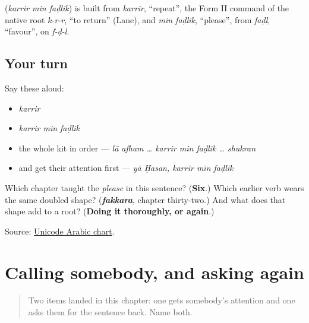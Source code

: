 \begin{cousinweb}
\textbf{  } (\emph{karrir min faḍlik}) is built from \emph{karrir}, \textquotedblleft{}repeat\textquotedblright{}, the Form II command of the native root \emph{k-r-r}, \textquotedblleft{}to return\textquotedblright{} (Lane), and \emph{min faḍlik}, \textquotedblleft{}please\textquotedblright{}, from \emph{faḍl}, \textquotedblleft{}favour\textquotedblright{}, on \emph{f-ḍ-l}.
\end{cousinweb}

\subsection*{Your turn}
Say these aloud:

\begin{itemize}
\raggedright
  \item \emph{karrir}
  \item \emph{karrir min faḍlik}
  \item the whole kit in order — \emph{lā afham … karrir min faḍlik … shukran}
  \item and get their attention first — \emph{yā Ḥasan, karrir min faḍlik}
\end{itemize}

\begin{tcolorbox}[breakable,colback=teal!4,colframe=teal!35!black,title={Before you move on}]
Which chapter taught the \emph{please} in this sentence? (\textbf{Six}.) Which earlier verb wears the same doubled shape? (\emph{\textbf{fakkara}}, chapter thirty-two.) And what does that shape add to a root? (\textbf{Doing it thoroughly, or again}.)

Source: \href{https://www.unicode.org/charts/PDF/U0600.pdf}{Unicode Arabic chart}.
\end{tcolorbox}
\section[\texorpdfstring{\ar{يا} · \ar{كرّر} \ar{من} \ar{فضلك} (yā · karrir min …)}{يا · كرّر من فضلك (yā · karrir min …)}]{Calling somebody, and asking again}

\label{lesson:AR-R41-calling-and-asking-again}



\begin{quote}
Two items landed in this chapter: one gets somebody's attention and one asks them for the sentence back. Name both.
\end{quote}

